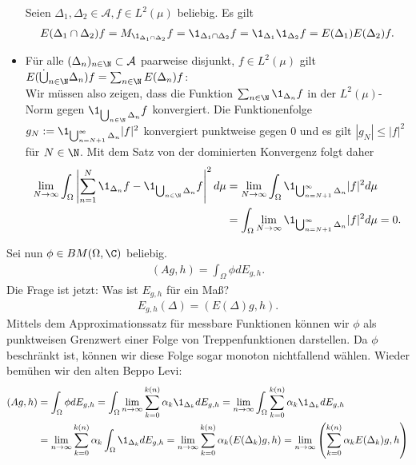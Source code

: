 \begin{solution}
\begin{itemize}
  Seien $\Delta_1,\Delta_2 \in \mathcal{A}, f \in L^2(\mu)$ beliebig. Es gilt
  \begin{align*}
    E(\Delta_1 \cap \Delta_2)f = M_{\1_{\Delta_1 \cap \Delta_2}}f
    = \1_{\Delta_1 \cap \Delta_2}f = \1_{\Delta_1}\1_{\Delta_2}f
    = E(\Delta_1)E(\Delta_2)f.
  \end{align*}
  \item Für alle $(\Delta_n)_{n \in \N} \subset \mathcal{A}$ paarweise disjunkt, $f \in L^2(\mu)$ gilt $E(\dot\bigcup_{n \in \N}\Delta_n)f = \sum_{n \in \N}E(\Delta_n)f$: \\
  Wir müssen also zeigen, dass die Funktion $\sum_{n \in \N}\1_{\Delta_n}f$
  in der $L^2(\mu)$-Norm gegen $\1_{\bigcup_{n \in \N}\Delta_n}f$ konvergiert.
  Die Funktionenfolge $g_N := \1_{\bigcup_{n = N+1}^\infty\Delta_n} |f|^2$ konvergiert punktweise gegen $0$ und es gilt $|g_N| \leq |f|^2$ für $N \in \N$.
  Mit dem Satz von der dominierten Konvergenz folgt daher
  \begin{align*}
  \lim_{N \to \infty}\int_\Omega \left|\sum_{n = 1}^N\1_{\Delta_n}f - \1_{\bigcup_{n \in \N}\Delta_n}f\right|^2 d\mu
  &= \lim_{N \to \infty}\int_\Omega \1_{\bigcup_{n = N+1}^\infty\Delta_n} |f|^2
   d\mu \\
  &= \int_\Omega \lim_{N \to \infty} \1_{\bigcup_{n = N+1}^\infty\Delta_n} |f|^2 d\mu = 0.
  \end{align*}
\end{itemize}
Sei nun $\phi \in BM(\Omega,\C)$ beliebig.
\begin{align*}
  (Ag,h) = \int_{\Omega}\phi dE_{g,h}.
\end{align*}
Die Frage ist jetzt: Was ist $E_{g,h}$ für ein Maß?
\begin{align*}
  E_{g,h}(\Delta) = (E(\Delta)g,h).
\end{align*}
Mittels dem Approximationssatz für messbare Funktionen können wir $\phi$
als punktweisen Grenzwert einer Folge von Treppenfunktionen darstellen.
Da $\phi$ beschränkt ist, können wir diese Folge sogar monoton nichtfallend wählen.
Wieder bemühen wir den alten Beppo Levi:
\begin{align*}
  (Ag,h) &= \int_{\Omega}\phi dE_{g,h} = \int_{\Omega}\lim_{n \to \infty}
  \sum_{k=0}^{k(n)}\alpha_k\1_{\Delta_k} dE_{g,h}
  = \lim_{n \to \infty}\int_{\Omega}\sum_{k=0}^{k(n)}\alpha_k\1_{\Delta_k} dE_{g,h} \\
  &= \lim_{n \to \infty}\sum_{k=0}^{k(n)}\alpha_k\int_{\Omega}\1_{\Delta_k} dE_{g,h}
  = \lim_{n \to \infty}\sum_{k=0}^{k(n)}\alpha_k(E(\Delta_k)g,h)
  = \lim_{n \to \infty}\left(\sum_{k=0}^{k(n)}\alpha_kE(\Delta_k)g,h\right) \\

\end{align*}
\end{solution}
